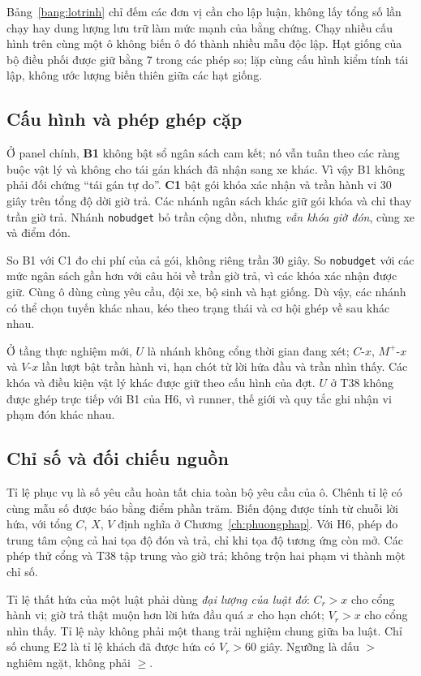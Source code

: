 Bảng~\ref{bang:lotrinh} chỉ đếm các đơn vị cần cho lập luận, không lấy tổng số lần chạy hay
dung lượng lưu trữ làm mức mạnh của bằng chứng. Chạy nhiều cấu hình trên cùng một ô không
biến ô đó thành nhiều mẫu độc lập. Hạt giống của bộ điều phối được giữ bằng 7 trong các
phép so; lặp cùng cấu hình kiểm tính tái lập, không ước lượng biến thiên giữa các hạt giống.

\subsection{Cấu hình và phép ghép cặp}

Ở panel chính, \textbf{B1} không bật sổ ngân sách cam kết; nó vẫn tuân theo các ràng buộc
vật lý và không cho tái gán khách đã nhận sang xe khác. Vì vậy B1 không phải đối chứng
``tái gán tự do''. \textbf{C1} bật gói khóa xác nhận và trần hành vi 30 giây trên tổng độ
dời giờ trả. Các nhánh ngân sách khác giữ gói khóa và chỉ thay trần giờ trả. Nhánh
\texttt{nobudget} bỏ trần cộng dồn, nhưng \emph{vẫn khóa giờ đón}, cùng xe và điểm đón.

So B1 với C1 đo chi phí của cả gói, không riêng trần 30 giây. So \texttt{nobudget} với các
mức ngân sách gần hơn với câu hỏi về trần giờ trả, vì các khóa xác nhận được giữ. Cùng ô
dùng cùng yêu cầu, đội xe, bộ sinh và hạt giống. Dù vậy, các nhánh có thể chọn tuyến khác
nhau, kéo theo trạng thái và cơ hội ghép về sau khác nhau.

Ở tầng thực nghiệm mới, $U$ là nhánh không cổng thời gian đang xét; $C$-$x$, $M^{+}$-$x$
và $V$-$x$ lần lượt bật trần hành vi, hạn chót từ lời hứa đầu và trần nhìn thấy. Các khóa
và điều kiện vật lý khác được giữ theo cấu hình của đợt. $U$ ở T38 không được ghép trực
tiếp với B1 của H6, vì runner, thế giới và quy tắc ghi nhận vi phạm đón khác nhau.

\subsection{Chỉ số và đối chiếu nguồn}

Tỉ lệ phục vụ là số yêu cầu hoàn tất chia toàn bộ yêu cầu của ô. Chênh tỉ lệ có cùng mẫu số
được báo bằng điểm phần trăm. Biến động được tính từ chuỗi lời hứa, với tổng $C$, $X$, $V$
định nghĩa ở Chương~\ref{ch:phuongphap}. Với H6, phép đo trung tâm cộng cả hai tọa độ đón
và trả, chỉ khi tọa độ tương ứng còn mở. Các phép thử cổng và T38 tập trung vào giờ trả;
không trộn hai phạm vi thành một chỉ số.

Tỉ lệ thất hứa của một luật phải dùng \emph{đại lượng của luật đó}: $C_r>x$ cho cổng hành
vi; giờ trả thật muộn hơn lời hứa đầu quá $x$ cho hạn chót; $V_r>x$ cho cổng nhìn thấy.
Tỉ lệ này không phải một thang trải nghiệm chung giữa ba luật. Chỉ số chung E2 là tỉ lệ
khách đã được hứa có $V_r>60$ giây. Ngưỡng là dấu $>$ nghiêm ngặt, không phải $\ge$.

